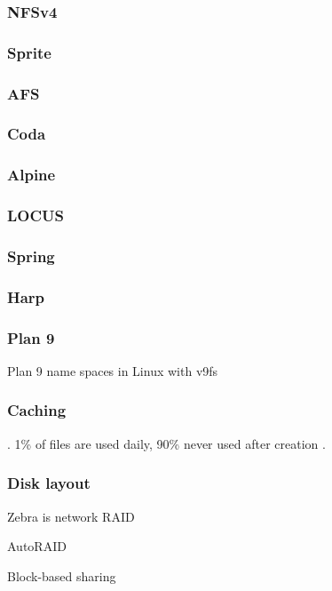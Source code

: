 \subsubsection{NFSv4}
\subsubsection{Sprite}
\cite{baker91,nelson}
\subsubsection{AFS}
\cite{howard}
\subsubsection{Coda}
\cite{kistler,satyanarayanan}
\subsubsection{Alpine}
\cite{brown}
\subsubsection{LOCUS}
\cite{walker}
\subsubsection{Spring}
\cite{khalidi}
\subsubsection{Harp}
\cite{liskov}
\subsubsection{Plan 9}
Plan 9 \cite{pike90} name spaces \cite{pike92} in Linux with v9fs \cite{hensbergen}
\subsubsection{Caching}
\cite{dahlin94a}\cite{chaiken}\cite{blaze}\cite{dahlin94b}\cite{keleher}\cite{muthitacharoen}. 1\% of files are used daily, 90\% never used after creation \cite{gibson98b}.
\subsubsection{Disk layout}
Zebra \cite{hartman} is network RAID \cite{patterson}

AutoRAID \cite{wilkes}

Block-based sharing \cite{mcgregor}

